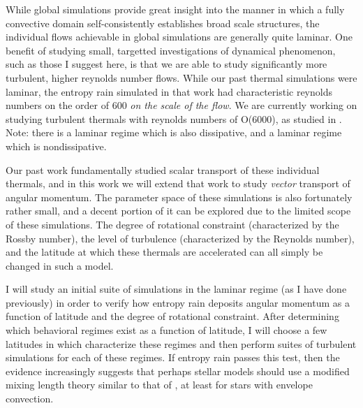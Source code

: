 \documentclass[aasms,12pt]{article}
\begin{document}
While global simulations provide great insight into the manner in which a fully convective domain self-consistently establishes broad scale structures, the individual flows achievable in global simulations are generally quite laminar.
One benefit of studying small, targetted investigations of dynamical phenomenon, such as those I suggest here, is that we are able to study significantly more turbulent, higher reynolds number flows.
While our past thermal simulations \citep{andersLB2019} were laminar, the entropy rain simulated in that work had characteristic reynolds numbers on the order of 600 \emph{on the scale of the flow}.
We are currently working on studying turbulent thermals with reynolds numbers of O(6000), as studied in \citet{lecoanet&jeevanjee2019}.
Note: there is a laminar regime which is also dissipative, and a laminar regime which is nondissipative.

Our past work fundamentally studied scalar transport of these individual thermals, and in this work we will extend that work to study \emph{vector} transport of angular momentum.
The parameter space of these simulations is also fortunately rather small, and a decent portion of it can be explored due to the limited scope of these simulations.
The degree of rotational constraint (characterized by the Rossby number), the level of turbulence (characterized by the Reynolds number), and the latitude at which these thermals are accelerated can all simply be changed in such a model.

I will study an initial suite of simulations in the laminar regime (as I have done previously) in order to verify how entropy rain deposits angular momentum as a function of latitude and the degree of rotational constraint.
After determining which behavioral regimes exist as a function of latitude, I will choose a few latitudes in which characterize these regimes and then perform suites of turbulent simulations for each of these regimes.
If entropy rain passes this test, then the evidence increasingly suggests that perhaps stellar models should use a modified mixing length theory similar to that of \citet{brandenburg2016}, at least for stars with envelope convection.
\end{document}

